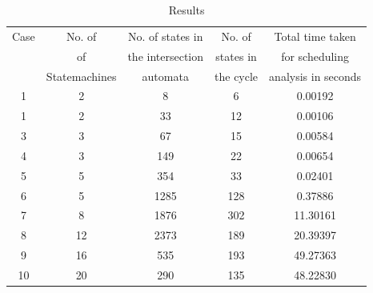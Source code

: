 \begin{table}[ht]
\caption{Results}
\centering
\begin{tabular}{|c | c | c | c | c |}
\hline %
Case & No. of           &  No. of states in   & No. of      & Total time taken          \\       
     & of               &  the intersection   & states in   & for scheduling            \\  
     & Statemachines    &  automata           & the cycle   & analysis in seconds   \\
\hline
\hline
1 & 2 & 8 & 6 & 0.00192\\

1 & 2  & 33 & 12 &  0.00106 \\

3 & 3  & 67 & 15 & 0.00584 \\

4 & 3 & 149 & 22 & 0.00654 \\

5 & 5 & 354 & 33 & 0.02401 \\

6 & 5 & 1285 & 128 & 0.37886\\

7 & 8 & 1876 & 302 & 11.30161\\

8 & 12 & 2373 & 189 & 20.39397\\

9 & 16 & 535 & 193 & 49.27363\\

10 & 20 & 290 & 135 & 48.22830\\

\hline

\end{tabular}
\label{table:nonlin}

\end{table}

